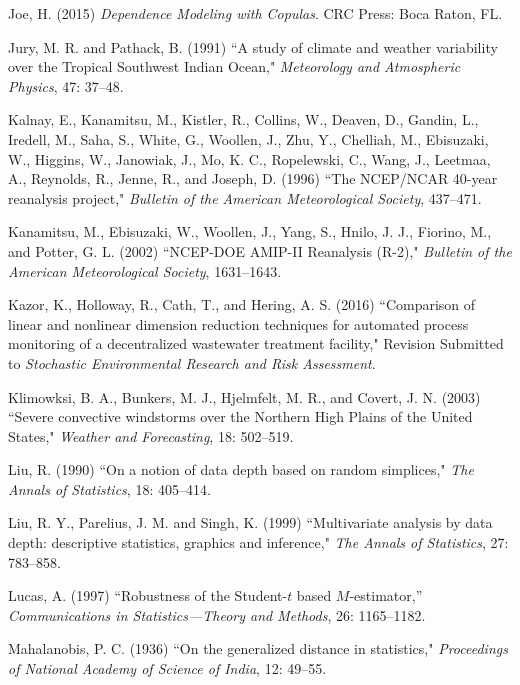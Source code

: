\documentclass[12pt]{article}
\def\refhg{\hangindent=20pt\hangafter=1}
\def\refmark{\par\vskip 2mm\noindent\refhg}
\def\refhg{\hangindent=20pt\hangafter=1}
\def\refmark{\par\vskip 2mm\noindent\refhg}
\begin{document}

\refmark Joe, H. (2015) \emph{Dependence Modeling with Copulas}.  CRC Press: Boca Raton, FL.

\refmark Jury, M. R. and Pathack, B. (1991) ``A study of climate and weather variability over the Tropical Southwest Indian Ocean," \emph{Meteorology and Atmospheric Physics}, 47:  37--48.

\refmark Kalnay, E., Kanamitsu, M., Kistler, R., Collins, W., Deaven, D., Gandin, L., Iredell, M., Saha, S., White, G., Woollen, J., Zhu, Y., Chelliah, M., Ebisuzaki, W., Higgins, W., Janowiak, J., Mo, K. C., Ropelewski, C., Wang, J., Leetmaa, A., Reynolds, R., Jenne, R., and Joseph, D. (1996) ``The NCEP/NCAR 40-year reanalysis project," \emph{Bulletin of the American Meteorological Society}, 437--471.

\refmark Kanamitsu, M., Ebisuzaki, W., Woollen, J., Yang, S., Hnilo, J. J., Fiorino, M., and Potter, G. L. (2002) ``NCEP-DOE AMIP-II Reanalysis (R-2)," \emph{Bulletin of the American Meteorological Society}, 1631--1643.

\refmark  Kazor, K., Holloway, R., Cath, T., and Hering, A. S. (2016) ``Comparison of linear and nonlinear dimension reduction techniques for automated process monitoring of a decentralized wastewater treatment facility," Revision Submitted to \emph{Stochastic Environmental Research and Risk Assessment}.

\refmark Klimowksi, B. A., Bunkers, M. J., Hjelmfelt, M. R., and Covert, J. N. (2003) ``Severe convective windstorms over the Northern High Plains of the United States," \emph{Weather and Forecasting}, 18: 502--519.

\refmark Liu, R. (1990) ``On a notion of data depth based on random simplices," \emph{The Annals of Statistics}, 18: 405--414.

\refmark Liu, R. Y., Parelius, J. M. and Singh, K. (1999) ``Multivariate analysis by data depth: descriptive statistics, graphics and inference," \emph{The Annals of Statistics}, 27: 783--858.


\refmark Lucas, A. (1997) ``Robustness of the Student-$t$ based $M$-estimator,'' \emph{Communications in Statistics---Theory and Methods}, 26: 1165--1182.

\refmark Mahalanobis, P. C. (1936) ``On the generalized distance in statistics," \emph{Proceedings of National Academy of Science of India}, 12: 49--55. 
\end{document}
